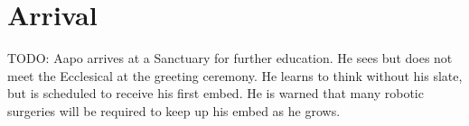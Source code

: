 %
%

\chapter{Arrival}

TODO: Aapo arrives at a Sanctuary for further education. He sees but does not meet the Ecclesical at the greeting ceremony. He learns to think without his slate, but is scheduled to receive his first embed. He is warned that many robotic surgeries will be required to keep up his embed as he grows.

\newpage
\thispagestyle{empty}
